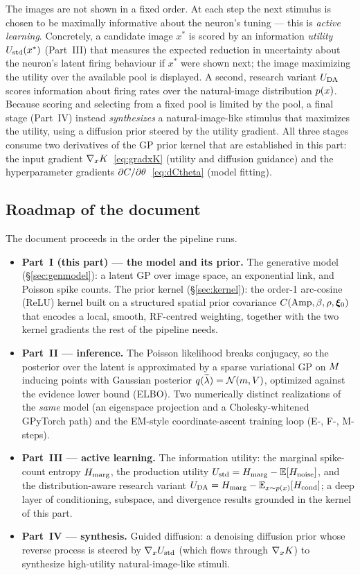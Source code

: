 The images are not shown in a fixed order. At each step the next stimulus is chosen
to be maximally informative about the neuron's tuning --- this is \emph{active
learning}. Concretely, a candidate image $x^{*}$ is scored by an information
\emph{utility} $U_{\mathrm{std}}(x^{*})$ (Part~III) that measures the expected reduction
in uncertainty about the neuron's latent firing behaviour if $x^{*}$ were shown
next; the image maximizing the utility over the available pool is displayed. A
second, research variant $U_{\mathrm{DA}}$ scores information about firing rates over the
natural-image distribution $p(x)$. Because scoring and selecting from a fixed pool
is limited by the pool, a final stage (Part~IV) instead \emph{synthesizes} a
natural-image-like stimulus that maximizes the utility, using a diffusion prior
steered by the utility gradient. All three stages consume two derivatives of the GP
prior kernel that are established in this part: the input gradient
$\nabla_xK$~\eqref{eq:gradxK} (utility and diffusion guidance) and the
hyperparameter gradients $\partial C/\partial\theta$~\eqref{eq:dCtheta} (model
fitting).

\subsection{Roadmap of the document}

The document proceeds in the order the pipeline runs.

\begin{itemize}[leftmargin=1.4em]
\item \textbf{Part~I (this part) --- the model and its prior.} The generative model
  (\S\ref{sec:genmodel}): a latent GP over image space, an exponential link, and
  Poisson spike counts. The prior kernel (\S\ref{sec:kernel}): the order-1
  arc-cosine (ReLU) kernel built on a structured spatial prior covariance
  $C(\mathrm{Amp},\beta,\rho,\bm{\xi}_{0})$ that encodes a local, smooth, RF-centred weighting,
  together with the two kernel gradients the rest of the pipeline needs.
\item \textbf{Part~II --- inference.} The Poisson likelihood breaks conjugacy, so
  the posterior over the latent is approximated by a sparse variational GP on $M$
  inducing points with Gaussian posterior $q(\widetilde{\lambda})=\mathcal{N}(m,V)$, optimized
  against the evidence lower bound (ELBO). Two numerically distinct realizations of
  the \emph{same} model (an eigenspace projection and a Cholesky-whitened GPyTorch
  path) and the EM-style coordinate-ascent training loop (E-, F-, M-steps).
\item \textbf{Part~III --- active learning.} The information utility: the marginal
  spike-count entropy $H_{\mathrm{marg}}$, the production utility
  $U_{\mathrm{std}}=H_{\mathrm{marg}}-\mathbb{E}[H_{\mathrm{noise}}]$, and the distribution-aware research variant
  $U_{\mathrm{DA}}=H_{\mathrm{marg}}-\mathbb{E}_{x\sim p(x)}[H_{\mathrm{cond}}]$; a deep layer of conditioning, subspace, and
  divergence results grounded in the kernel of this part.
\item \textbf{Part~IV --- synthesis.} Guided diffusion: a denoising diffusion prior
  whose reverse process is steered by $\nabla_xU_{\mathrm{std}}$ (which flows through
  $\nabla_xK$) to synthesize high-utility natural-image-like stimuli.
\end{itemize}

